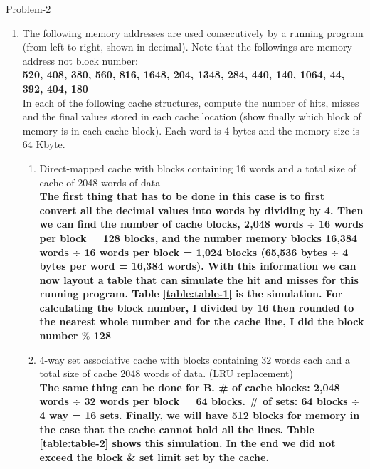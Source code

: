 	\begin{problem}{}{Problem-2}
		\begin{enumerate}
			\item The following memory addresses are used consecutively by a running program (from left to right, shown in decimal). Note that the followings are memory address not block number:\\ \textbf{520, 408, 380, 560, 816, 1648, 204, 1348, 284, 440, 140, 1064, 44, 392, 404, 180}\\ In each of the following cache structures, compute the number of hits, misses and the final values stored in each cache location (show finally which block of memory is in each cache block). Each word is 4-bytes and the memory size is 64 Kbyte.
			\begin{enumerate}[label=(\alph*)]
				\item Direct-mapped cache with blocks containing 16 words and a total size of cache of 2048 words of data\\
				\textbf{The first thing that has to be done in this case is to first convert all the decimal values into words by dividing by 4. Then we can find the number of cache blocks, 2,048 words $\div$ 16 words per block = 128 blocks, and the number memory blocks 16,384 words $\div$ 16 words per block = 1,024 blocks (65,536 bytes $\div$ 4 bytes per word = 16,384 words). With this information we can now layout a table that can simulate the hit and misses for this running program. Table \ref{table:table-1} is the simulation. For calculating the block number, I divided by 16 then rounded to the nearest whole number and for the cache line, I did the block number $\%$ 128} 
				\item 4-way set associative cache with blocks containing 32 words each and a total size of cache 2048 words of data. (LRU replacement)\\
				\textbf{The same thing can be done for B. \# of cache blocks: 2,048 words $\div$ 32 words per block = 64 blocks.  \# of sets: 64 blocks $\div$ 4 way = 16 sets. Finally, we will have 512 blocks for memory in the case that the cache cannot hold all the lines. Table \ref{table:table-2}  shows this simulation. In the end we did not exceed the block \& set limit set by the cache.}
			\end{enumerate}
		\end{enumerate}
	\end{problem}
